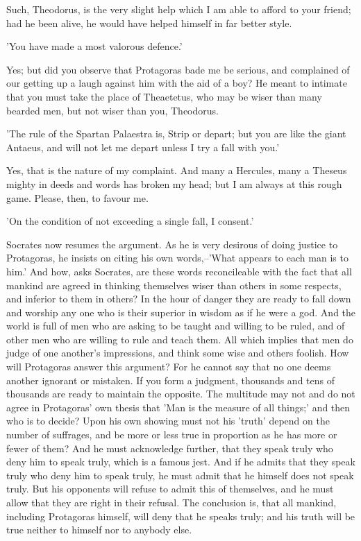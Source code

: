 Such, Theodorus, is the very slight help which I am able to afford to
your friend; had he been alive, he would have helped himself in far
better style.

'You have made a most valorous defence.'

Yes; but did you observe that Protagoras bade me be serious, and
complained of our getting up a laugh against him with the aid of a boy?
He meant to intimate that you must take the place of Theaetetus, who may
be wiser than many bearded men, but not wiser than you, Theodorus.

'The rule of the Spartan Palaestra is, Strip or depart; but you are like
the giant Antaeus, and will not let me depart unless I try a fall with
you.'

Yes, that is the nature of my complaint. And many a Hercules, many a
Theseus mighty in deeds and words has broken my head; but I am always at
this rough game. Please, then, to favour me.

'On the condition of not exceeding a single fall, I consent.'

Socrates now resumes the argument. As he is very desirous of doing
justice to Protagoras, he insists on citing his own words,--'What
appears to each man is to him.' And how, asks Socrates, are these words
reconcileable with the fact that all mankind are agreed in thinking
themselves wiser than others in some respects, and inferior to them in
others? In the hour of danger they are ready to fall down and worship
any one who is their superior in wisdom as if he were a god. And the
world is full of men who are asking to be taught and willing to be
ruled, and of other men who are willing to rule and teach them. All
which implies that men do judge of one another's impressions, and think
some wise and others foolish. How will Protagoras answer this argument?
For he cannot say that no one deems another ignorant or mistaken. If you
form a judgment, thousands and tens of thousands are ready to maintain
the opposite. The multitude may not and do not agree in Protagoras'
own thesis that 'Man is the measure of all things;' and then who is to
decide? Upon his own showing must not his 'truth' depend on the number
of suffrages, and be more or less true in proportion as he has more or
fewer of them? And he must acknowledge further, that they speak truly
who deny him to speak truly, which is a famous jest. And if he admits
that they speak truly who deny him to speak truly, he must admit that
he himself does not speak truly. But his opponents will refuse to admit
this of themselves, and he must allow that they are right in their
refusal. The conclusion is, that all mankind, including Protagoras
himself, will deny that he speaks truly; and his truth will be true
neither to himself nor to anybody else.

